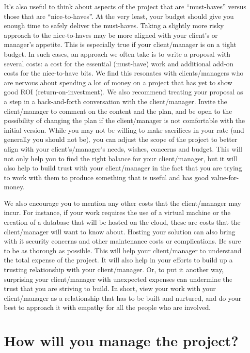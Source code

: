 \documentclass[
]{book}
\begin{document}
It's also useful to think about aspects of the project that are
``must-haves'' versus those that are ``nice-to-haves''. At the very
least, your budget should give you enough time to safely deliver the
must-haves. Taking a slightly more risky approach to the nice-to-haves
may be more aligned with your client's or manager's appetite. This is
especially true if your client/manager is on a tight budget. In such
cases, an approach we often take is to write a proposal with several
costs: a cost for the essential (must-have) work and additional add-on
costs for the nice-to-have bits. We find this resonates with
clients/managers who are nervous about spending a lot of money on a
project that has yet to show good ROI (return-on-investment). We also
recommend treating your proposal as a step in a back-and-forth
conversation with the client/manager. Invite the client/manager to
comment on the content and the plan, and be open to the possibility of
changing the plan if the client/manager is not comfortable with the
initial version. While you may not be willing to make sacrifices in your
rate (and generally you should not be), you can adjust the scope of the
project to better align with your client's/manager's needs, wishes,
concerns and budget. This will not only help you to find the right
balance for your client/manager, but it will also help to build trust
with your client/manager in the fact that you are trying to work with
them to produce something that is useful and has good value-for-money.

We also encourage you to mention any other costs that the client/manager
may incur. For instance, if your work requires the use of a virtual
machine or the creation of a database that will be hosted on the cloud,
these are costs that the client/manager will want to know about. Hosting
your solution can also bring with it security concerns and other
maintenance costs or complications. Be sure to be as thorough as
possible. This will help your client/manager to understand the total
expense of the project. It will also help in your efforts to build up a
trusting relationship with your client/manager. Or, to put it another
way, surprising your client/manager with unexpected expenses can
undermine the trust that you are striving to build. In short, view your
work with your client/manager as a relationship that has to be built and
nurtured, and do your best to approach it with empathy for all the
people who are involved.

\hypertarget{how-will-you-manage-the-project}{%
\section{How will you manage the
project?}\label{how-will-you-manage-the-project}}
\end{document}
